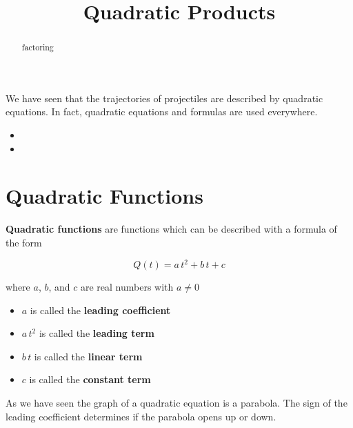 \documentclass{ximera}
\title{Quadratic Products}
\begin{document}
\begin{abstract}
factoring
\end{abstract}
\maketitle



We have seen that the trajectories of projectiles are described by quadratic equations.  In fact, quadratic equations and formulas are used everywhere.


\begin{itemize}
\item {}
\item {}
\end{itemize}







\section{Quadratic Functions}


\begin{definition}
\textbf{Quadratic functions} are functions which can be described with a formula of the form

\[  Q(t) = a \, t^2 + b \, t + c  \]

where $a$, $b$, and $c$ are real numbers with $a \ne 0$



\begin{itemize}
\item $a$ is called the \textbf{leading coefficient} 
\item $a \, t^2$ is called the \textbf{leading term} 
\item $b \, t$ is called the \textbf{linear term} 
\item $c$ is called the \textbf{constant term} 
\end{itemize}

\end{definition}




As we have seen the graph of a quadratic equation is a parabola. The sign of the leading coefficient determines if the parabola opens up or down.
\end{document}
